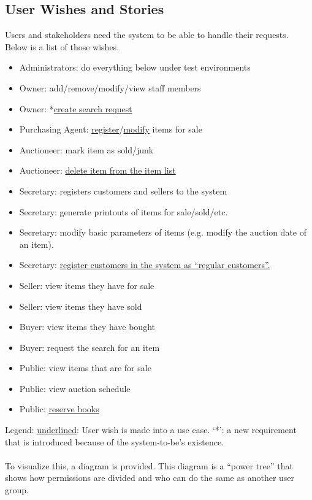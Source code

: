 \subsection{User Wishes and Stories}
Users and stakeholders need the system to be able to handle their requests. Below is a list of those wishes.
\begin{itemize}[noitemsep]
	\item Administrators: do everything below under test environments
	\item Owner: add/remove/modify/view staff members
	\item Owner: *\underline{create search request}
	\item Purchasing Agent: \underline{register}/\underline{modify} items for sale
	\item Auctioneer: mark item as sold/junk
	\item Auctioneer: \underline{delete item from the item list}
	\item Secretary: registers customers and sellers to the system
	\item Secretary: generate printouts of items for sale/sold/etc.
	\item Secretary: modify basic parameters of items (e.g. modify the auction date of an item).
	\item Secretary: \underline{register customers in the system as ``regular customers''.}
	\item Seller: view items they have for sale
	\item Seller: view items they have sold
	\item Buyer: view items they have bought
	\item Buyer: request the search for an item
	\item Public: view items that are for sale
	\item Public: view auction schedule
	\item Public: \underline{reserve books}
\end{itemize}
Legend: \underline{underlined}: User wish is made into a use case. `*': a new requirement that is introduced because of the system-to-be's existence.\\\\
To visualize this, a diagram is provided. This diagram is a ``power tree'' that shows how permissions are divided and who can do the same as another user group.
